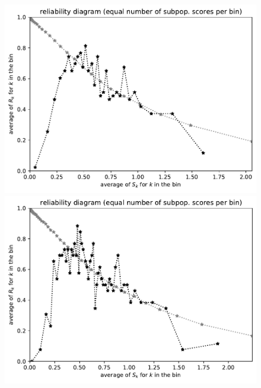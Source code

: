 \documentclass{article}
\begin{document}
\begin{figure}
\begin{centering}
\parbox{\imsize}{\includegraphics[width=\imsize]
                {./codes/unweighted/nll-1-248-Eskimo-dog-huskyequisamps30}}
\quad\quad
\parbox{\imsize}{\includegraphics[width=\imsize]
                {./codes/unweighted/nll-1-248-Eskimo-dog-huskyequisamps50}}

\vspace{\vertsep}


\end{centering}
\end{figure}
\end{document}
